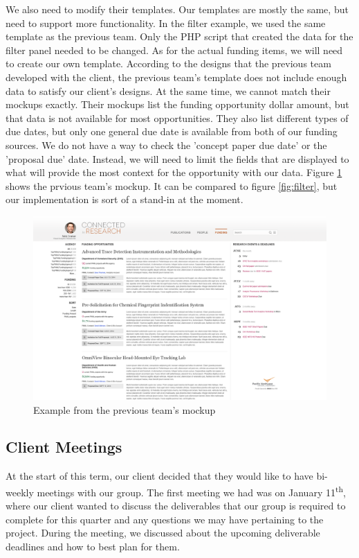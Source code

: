 \documentclass[onecolumn]{IEEEtran}
\begin{document}
We also need to modify their templates. Our templates are mostly the same, but need to support more functionality. In the filter example, we used the same template as the previous team. Only the PHP script that created the data for the filter panel needed to be changed. As for the actual funding items, we will need to create our own template. According to the designs that the previous team developed with the client, the previous team's template does not include enough data to satisfy our client's designs. At the same time, we cannot match their mockups exactly. Their mockups list the funding opportunity dollar amount, but that data is not available for most opportunities. They also list different types of due dates, but only one general due date is available from both of our funding sources. We do not have a way to check the 'concept paper due date' or the 'proposal due' date. Instead, we will need to limit the fields that are displayed to what will provide the most context for the opportunity with our data. Figure \ref{fig:mockup} shows the prvious team's mockup. It can be compared to figure \ref{fig:filter}, but our implementation is sort of a stand-in at the moment.

\begin{figure}
    \centering
    \includegraphics[width=1.0\textwidth]{funding-default-view.png}
    \caption{Example from the previous team's mockup}
    \label{fig:mockup}
\end{figure}

\subsection{Client Meetings}

At the start of this term, our client decided that they would like to have bi-weekly meetings with our group. The first meeting we had was on January 11\textsuperscript{th},  where our client wanted to discuss the deliverables that our group is required to complete for this quarter and any questions we may have pertaining to the project. During the meeting, we discussed about the upcoming deliverable deadlines and how to best plan for them.
\end{document}
